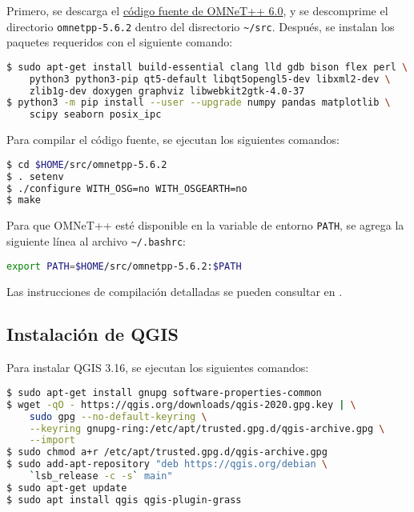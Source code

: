 \label{subsec:instalacion_omnet}

Primero, se descarga el \href{https://omnetpp.org/download/}{código fuente de
OMNeT++ 6.0}, y se descomprime el directorio
{\lstinline[language=bash]!omnetpp-5.6.2!} dentro del disrectorio
{\lstinline[language=bash]!~/src!}. Después, se instalan los paquetes
requeridos con el siguiente comando:

\begin{lstlisting}[language=bash]
$ sudo apt-get install build-essential clang lld gdb bison flex perl \
    python3 python3-pip qt5-default libqt5opengl5-dev libxml2-dev \
    zlib1g-dev doxygen graphviz libwebkit2gtk-4.0-37
$ python3 -m pip install --user --upgrade numpy pandas matplotlib \
    scipy seaborn posix_ipc
\end{lstlisting}

Para compilar el código fuente, se ejecutan los siguientes comandos:

\begin{lstlisting}[language=bash]
$ cd $HOME/src/omnetpp-5.6.2
$ . setenv
$ ./configure WITH_OSG=no WITH_OSGEARTH=no
$ make
\end{lstlisting}

Para que OMNeT++ esté disponible en la variable de entorno
{\lstinline[language=bash]!PATH!}, se agrega la siguiente línea al archivo
{\lstinline[language=bash]!~/.bashrc!}:

\begin{lstlisting}[language=bash]
export PATH=$HOME/src/omnetpp-5.6.2:$PATH
\end{lstlisting}

Las instrucciones de compilación detalladas se pueden consultar en
\cite{CompilacionOMNeT}.


\subsection{Instalación de QGIS}

\label{subsec:instalacion_qgis}

Para instalar QGIS 3.16, se ejecutan los siguientes comandos:

\begin{lstlisting}[language=bash]
$ sudo apt-get install gnupg software-properties-common
$ wget -qO - https://qgis.org/downloads/qgis-2020.gpg.key | \
    sudo gpg --no-default-keyring \
    --keyring gnupg-ring:/etc/apt/trusted.gpg.d/qgis-archive.gpg \
    --import
$ sudo chmod a+r /etc/apt/trusted.gpg.d/qgis-archive.gpg
$ sudo add-apt-repository "deb https://qgis.org/debian \
    `lsb_release -c -s` main"
$ sudo apt-get update
$ sudo apt install qgis qgis-plugin-grass
\end{lstlisting}

